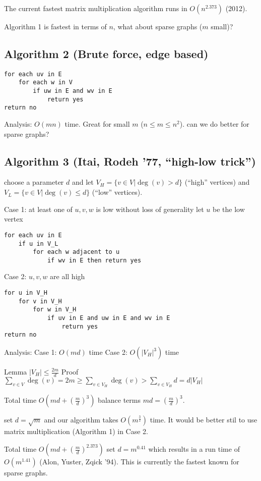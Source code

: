 \documentclass[english,12pt]{article}
\theoremstyle{plain}
\theoremstyle{definition}
\theoremstyle{definition} %
\begin{document}
The current fastest matrix multiplication algorithm runs in $O(n^{2.373})$ (2012).

Algorithm 1 is fastest in terms of $n$, what about sparse graphs ($m$ small)?

\subsection{Algorithm 2 (Brute force, edge based)}
\begin{verbatim}
for each uv in E
    for each w in V
        if uw in E and wv in E
            return yes
return no
\end{verbatim}

Analysis: $O(mn)$ time.  Great for small $m$ ($n\le m\le n^2$).  can we do better for sparse graphs?

\subsection{Algorithm 3 (Itai, Rodeh '77, ``high-low trick'')}
choose a parameter $d$ and let $V_H = \{v\in V|\deg(v) > d\}$ (``high'' vertices) and $V_L = \{v\in V|\deg(v) \le d\}$ (``low'' vertices).

Case 1: at least one of $u,v,w$ is low without loss of generality let $u$ be the low vertex
\begin{verbatim}
for each uv in E
    if u in V_L
        for each w adjacent to u
            if wv in E then return yes
\end{verbatim}

Case 2: $u,v,w$ are all high
\begin{verbatim}
for u in V_H
    for v in V_H
        for w in V_H
            if uv in E and uw in E and wv in E
                return yes
return no
\end{verbatim}

Analysis:
Case 1: $O(md)$ time
Case 2: $O(|V_H|^3)$ time

Lemma $|V_H|\le \frac{2m}{d}$
Proof $\sum_{v\in V}\deg(v) = 2m\ge \sum_{v\in V_H}\deg(v)>\sum_{v\in V_H}d = d|V_H|$

Total time $O\left(md + \left(\frac{m}{d}\right)^3\right)$
balance terms $md = \left(\frac{m}{d}\right)^3$.

set $d=\sqrt{m}$ and our algorithm takes $O(m^{\frac{3}{2}})$ time.  It would be better stil to use matrix multiplication (Algorithm 1) in Case 2.

Total time $O\left(md + \left(\frac{m}{d}\right)^{2.373}\right)$
set $d=m^{0.41}$ which results in a run time of $O(m^{1.41})$ (Alon, Yuster, Zqick '94).  This is currently the fastest known for sparse graphs.
\end{document}
